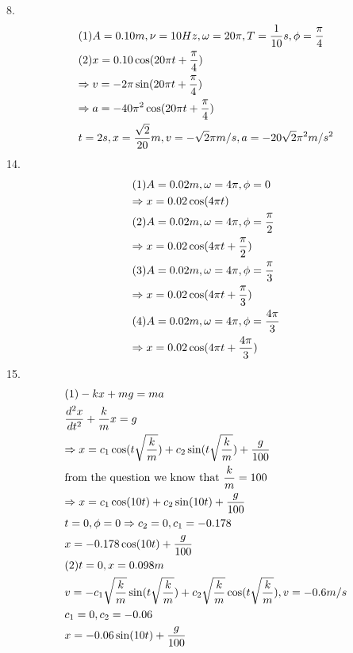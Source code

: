 \documentclass{article}
\begin{document}
8.\[\begin{gathered}
  (1)A = 0.10m,\nu  = 10Hz,\omega  = 20\pi ,T = \frac{1}{{10}}s,\phi  = \frac{\pi }{4} \hfill \\
  (2)x = 0.10\cos (20\pi t + \frac{\pi }{4}) \hfill \\
   \Rightarrow v =  - 2\pi \sin (20\pi t + \frac{\pi }{4}) \hfill \\
   \Rightarrow a =  - 40{\pi ^2}\cos (20\pi t + \frac{\pi }{4}) \hfill \\
  t = 2s,x = \frac{{\sqrt 2 }}{{20}}m,v =  - \sqrt 2 \pi m/s,a =  - 20\sqrt 2 {\pi ^2}m/{s^2} \hfill \\
\end{gathered} \]
14.\[\begin{gathered}
  (1)A = 0.02m,\omega  = 4\pi ,\phi  = 0 \hfill \\
   \Rightarrow x = 0.02\cos (4\pi t) \hfill \\
  (2)A = 0.02m,\omega  = 4\pi ,\phi  = \frac{\pi }{2} \hfill \\
   \Rightarrow x = 0.02\cos (4\pi t + \frac{\pi }{2}) \hfill \\
  (3)A = 0.02m,\omega  = 4\pi ,\phi  = \frac{\pi }{3} \hfill \\
   \Rightarrow x = 0.02\cos (4\pi t + \frac{\pi }{3}) \hfill \\
  (4)A = 0.02m,\omega  = 4\pi ,\phi  = \frac{{4\pi }}{3} \hfill \\
   \Rightarrow x = 0.02\cos (4\pi t + \frac{{4\pi }}{3}) \hfill \\
\end{gathered} \]
15.\[\begin{gathered}
  (1) - kx + mg = ma \hfill \\
  \frac{{{d^2}x}}{{d{t^2}}} + \frac{k}{m}x = g \hfill \\
   \Rightarrow x = {c_1}\cos (t\sqrt {\frac{k}{m}} ) + {c_2}\sin (t\sqrt {\frac{k}{m}} ) + \frac{g}{{100}} \hfill \\
  {\text{from the question we know that }}\frac{k}{m} = 100 \hfill \\
   \Rightarrow x = {c_1}\cos (10t) + {c_2}\sin (10t) + \frac{g}{{100}} \hfill \\
  t = 0,\phi  = 0 \Rightarrow {c_2} = 0,{c_1} =  - 0.178 \hfill \\
  x =  - 0.178\cos (10t) + \frac{g}{{100}} \hfill \\
  (2)t = 0,x = 0.098m \hfill \\
  v =  - {c_1}\sqrt {\frac{k}{m}} \sin (t\sqrt {\frac{k}{m}} ) + {c_2}\sqrt {\frac{k}{m}} \cos (t\sqrt {\frac{k}{m}} ),v =  - 0.6m/s \hfill \\
  {c_1} = 0,{c_2} =  - 0.06 \hfill \\
  x =  - 0.06\sin (10t) + \frac{g}{{100}} \hfill \\
\end{gathered} \]
\end{document}
